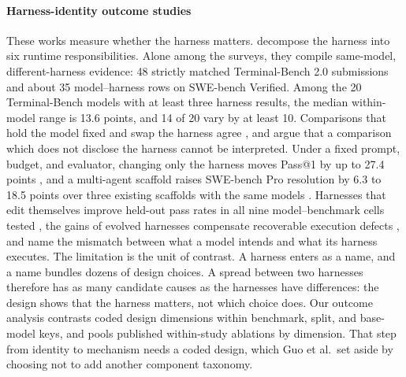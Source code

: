 \paragraph{Harness-identity outcome studies}
These works measure whether the harness matters. \citet{guo2026qa2task} decompose the harness into six
runtime responsibilities. Alone among the surveys, they compile same-model, different-harness evidence:
48 strictly matched Terminal-Bench 2.0 submissions and about 35 model--harness rows on
SWE-bench Verified. Among the 20 Terminal-Bench models with at least three harness results, the median
within-model range is 13.6 points, and 14 of 20 vary by at least 10. Comparisons that hold the model
fixed and swap the harness agree \citep{harnessbench2026,samemodel2026harness,scaffoldeffect2026}, and
\citet{zhang2026harnessreporting} argue that a comparison which does not disclose the harness cannot be
interpreted.
Under a fixed prompt, budget, and evaluator, changing only the harness moves Pass@1 by up to 27.4 points
\citep{clawswebench2026}, and a multi-agent scaffold raises SWE-bench Pro resolution by 6.3 to 18.5
points over three existing scaffolds with the same models \citep{icatagent2026}. Harnesses that edit
themselves improve held-out pass rates in all nine model--benchmark cells tested
\citep{selfharness2026}, the gains of evolved harnesses compensate recoverable execution defects
\citep{onerecipe2026harnesses}, and \citet{intentexecution2026} name the mismatch between what a model
intends and what its harness executes.
The limitation is the unit of contrast. A harness enters as a name, and a name bundles
dozens of design choices. A spread between two harnesses therefore has as many candidate causes as the
harnesses have differences: the design shows that the harness matters, not which choice does. Our
outcome analysis contrasts coded design dimensions within benchmark, split, and base-model keys, and
pools published within-study ablations by dimension. That step from identity to mechanism needs a coded
design, which Guo et al.\ set aside by choosing not to add another component taxonomy.

